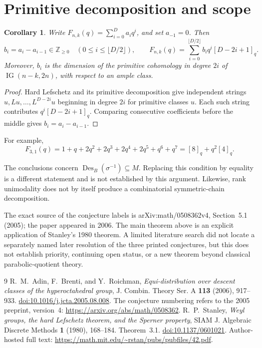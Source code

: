 \documentclass[11pt]{article}
\newtheorem{corollary}[theorem]{Corollary}
\newcommand{\Des}{\operatorname{Des}}
\begin{document}
\section{Primitive decomposition and scope}
\begin{corollary}
Write $F_{n,k}(q)=\sum_{i=0}^D a_iq^i$, and set $a_{-1}=0$. Then
\[
b_i=a_i-a_{i-1}\in\mathbb Z_{\ge0}
\quad(0\le i\le\lfloor D/2\rfloor),
\qquad
F_{n,k}(q)=\sum_{i=0}^{\lfloor D/2\rfloor}b_iq^i[D-2i+1]_q.
\]
Moreover, $b_i$ is the dimension of the primitive cohomology in degree
$2i$ of $\operatorname{IG}(n-k,2n)$, with respect to an ample class.
\end{corollary}
\begin{proof}
Hard Lefschetz and its primitive decomposition give independent strings
$u,Lu,\ldots,L^{D-2i}u$ beginning in degree $2i$ for primitive classes $u$.
Each such string contributes $q^i[D-2i+1]_q$. Comparing consecutive
coefficients before the middle gives $b_i=a_i-a_{i-1}$.
\end{proof}
For example,
\[
F_{3,1}(q)=1+q+2q^2+2q^3+2q^4+2q^5+q^6+q^7
 =[8]_q+q^2[4]_q.
\]

The conclusions concern $\Des_B(\sigma^{-1})\subseteq M$. Replacing
this condition by equality is a different statement and is not established
by this argument. Likewise, rank unimodality does not by itself produce
a combinatorial symmetric-chain decomposition.

The exact source of the conjecture labels is arXiv:math/0508362v4,
Section~5.1 (2005); the paper appeared in 2006. The main theorem above
is an explicit application of Stanley's 1980 theorem. A limited literature
search did not locate a separately named later resolution of the three
printed conjectures, but this does not establish priority, continuing
open status, or a new theorem beyond classical parabolic-quotient theory.

\begin{thebibliography}{9}
R.~M.~Adin, F.~Brenti, and Y.~Roichman,
\emph{Equi-distribution over descent classes of the hyperoctahedral group},
J. Combin. Theory Ser. A \textbf{113} (2006), 917--933.
\href{https://doi.org/10.1016/j.jcta.2005.08.008}{doi:10.1016/j.jcta.2005.08.008}.
The conjecture numbering refers to the 2005 preprint, version~4:
\url{https://arxiv.org/abs/math/0508362}.
R.~P.~Stanley,
\emph{Weyl groups, the hard Lefschetz theorem, and the Sperner property},
SIAM J. Algebraic Discrete Methods \textbf{1} (1980), 168--184.
Theorem~3.1.
\href{https://doi.org/10.1137/0601021}{doi:10.1137/0601021}.
Author-hosted full text:
\url{https://math.mit.edu/~rstan/pubs/pubfiles/42.pdf}.
\end{thebibliography}
\end{document}
